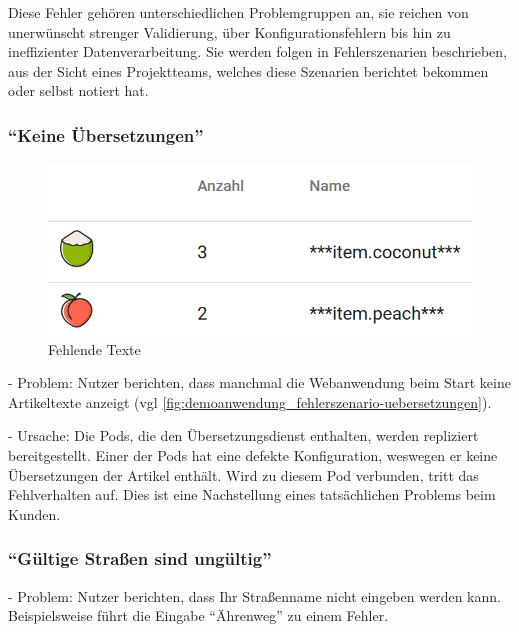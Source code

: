 Diese Fehler gehören unterschiedlichen Problemgruppen an, sie reichen von unerwünscht strenger Validierung, über Konfigurationsfehlern bis hin zu ineffizienter Datenverarbeitung. Sie werden folgen in Fehlerszenarien beschrieben, aus der Sicht eines Projektteams, welches diese Szenarien berichtet bekommen oder selbst notiert hat.

\subsubsection{\enquote{Keine Übersetzungen}}

\begin{figure}
\centering
\vspace{-\baselineskip}
\includegraphics[width=\linewidth]{img/04_erstellung-poc/demoanwendung_fehlerszenario-uebersetzungen}
\caption{Fehlende Texte}
\label{fig:demoanwendung_fehlerszenario-uebersetzungen}
\end{figure}

- Problem: Nutzer berichten, dass manchmal die Webanwendung beim Start keine Artikeltexte anzeigt (vgl \autoref{fig:demoanwendung_fehlerszenario-uebersetzungen}).

- Ursache: Die Pods, die den Übersetzungsdienst enthalten, werden repliziert bereitgestellt. Einer der Pods hat eine defekte Konfiguration, weswegen er keine Übersetzungen der Artikel enthält. Wird zu diesem Pod verbunden, tritt das Fehlverhalten auf. Dies ist eine Nachstellung eines tatsächlichen Problems beim Kunden.

\subsubsection{\enquote{Gültige Straßen sind ungültig}}

- Problem: Nutzer berichten, dass Ihr Straßenname nicht eingeben werden kann. Beispielsweise führt die Eingabe \enquote{Ährenweg} zu einem Fehler.

